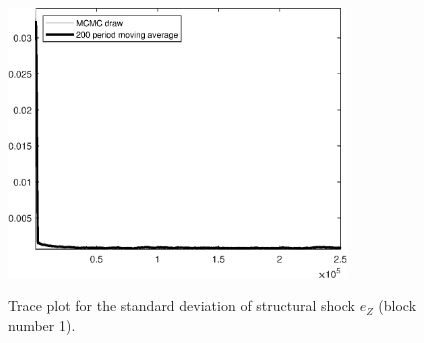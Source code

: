 \begin{figure}[H]
\centering
  \includegraphics[width=0.8\textwidth]{BRS_extended_fd/graphs/TracePlot_SE_e_Z_blck_1}\\
    \caption{Trace plot for the standard deviation of structural shock ${e_Z}$ (block number 1).}
\end{figure}
